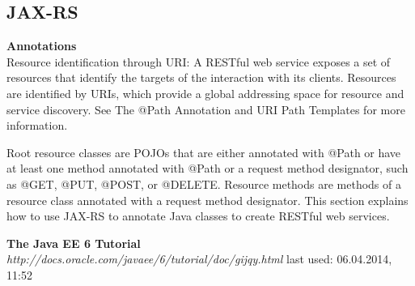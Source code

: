 \documentclass[12pt]{article}
\begin{document}
\subsection{JAX-RS}
\textbf{Annotations}\\
Resource identification through URI: A RESTful web service exposes a set of resources that identify the targets of the interaction with its clients. Resources are identified by URIs, which provide a global addressing space for resource and service discovery. See The @Path Annotation and URI Path Templates for more information.



Root resource classes are POJOs that are either annotated with @Path or have at least one method annotated with @Path or a request method designator, such as @GET, @PUT, @POST, or @DELETE. Resource methods are methods of a resource class annotated with a request method designator. This section explains how to use JAX-RS to annotate Java classes to create RESTful web services.




\newpage
\begin{thebibliography}{56}

   \textbf{The Java EE 6 Tutorial} \\
  \textit{http://docs.oracle.com/javaee/6/tutorial/doc/gijqy.html}
  \newline last used: 06.04.2014, 11:52
\end{thebibliography}
\end{document}
